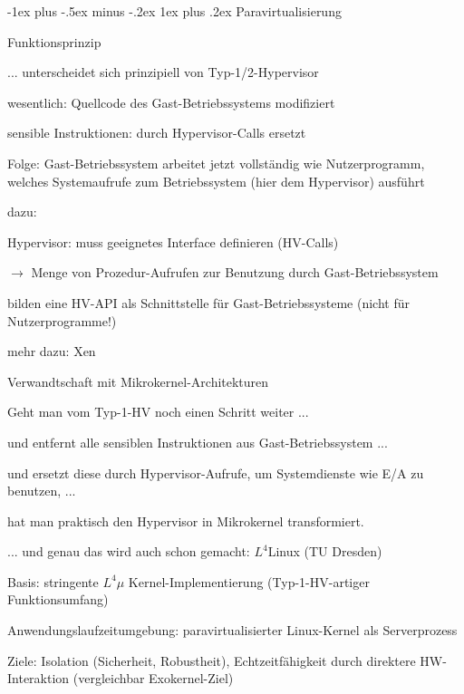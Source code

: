 \documentclass[a4paper]{article}
\makeatletter
\renewcommand{\subsubsection}{\@startsection{subsubsection}{3}{0mm}%
 {-1ex plus -.5ex minus -.2ex}%
 {1ex plus .2ex}%
 {\normalfont\small\bfseries}}
\makeatother
\begin{document}
\begin{multicols}{3}
    \subsubsection{Paravirtualisierung}

    Funktionsprinzip

    \begin{itemize*}
        \item
        ... unterscheidet sich prinzipiell von Typ-1/2-Hypervisor
        \item
        wesentlich: Quellcode des Gast-Betriebssystems modifiziert
        \item
        sensible Instruktionen: durch Hypervisor-Calls ersetzt
        \item
        Folge: Gast-Betriebssystem arbeitet jetzt vollständig wie
        Nutzerprogramm, welches Systemaufrufe zum Betriebssystem (hier dem
        Hypervisor) ausführt
        \item
        dazu:
        \begin{itemize*}
            \item Hypervisor: muss geeignetes Interface definieren (HV-Calls)
            \item $\rightarrow$ Menge von Prozedur-Aufrufen zur Benutzung durch Gast-Betriebssystem
            \item bilden eine HV-API als Schnittstelle für Gast-Betriebssysteme (nicht für Nutzerprogramme!)
        \end{itemize*}
        \item
        mehr dazu: Xen
    \end{itemize*}

    Verwandtschaft mit Mikrokernel-Architekturen

    \begin{itemize*}
        \item
        Geht man vom Typ-1-HV noch einen Schritt weiter ...
        \begin{itemize*}
            \item und entfernt alle sensiblen Instruktionen aus Gast-Betriebssystem ...
            \item und ersetzt diese durch Hypervisor-Aufrufe, um Systemdienste wie E/A zu benutzen, ...
            \item hat man praktisch den Hypervisor in Mikrokernel transformiert.
        \end{itemize*}
        \item
        ... und genau das wird auch schon gemacht: $L^4$Linux (TU
        Dresden)
        \begin{itemize*}
            \item Basis: stringente $L^4\mu$ Kernel-Implementierung (Typ-1-HV-artiger Funktionsumfang)
            \item Anwendungslaufzeitumgebung: paravirtualisierter Linux-Kernel als Serverprozess
            \item Ziele: Isolation (Sicherheit, Robustheit), Echtzeitfähigkeit durch direktere HW-Interaktion (vergleichbar Exokernel-Ziel)
        \end{itemize*}
    \end{itemize*}


\end{multicols}
\end{document}
